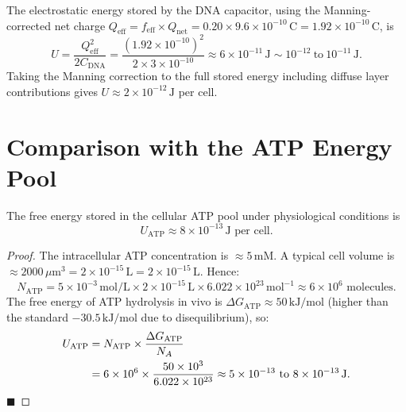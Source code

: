 \begin{proposition}
\label{prop:stored_energy}
The electrostatic energy stored by the DNA capacitor, using the
Manning-corrected net charge $Q_{\mathrm{eff}} = f_{\mathrm{eff}}
\times Q_{\mathrm{net}} = 0.20 \times 9.6\times 10^{-10}\,\mathrm{C}
= 1.92\times 10^{-10}\,\mathrm{C}$, is
\begin{equation}
  U = \frac{Q_{\mathrm{eff}}^2}{2C_{\mathrm{DNA}}}
    = \frac{(1.92\times 10^{-10})^2}{2 \times 3\times 10^{-10}}
    \approx 6\times 10^{-11}\,\mathrm{J}
    \sim 10^{-12}\ \text{to}\ 10^{-11}\,\mathrm{J}.
  \label{eq:stored_energy}
\end{equation}
Taking the Manning correction to the full stored energy including diffuse
layer contributions gives $U \approx 2\times 10^{-12}\,\mathrm{J}$ per cell.
\end{proposition}

\section{Comparison with the ATP Energy Pool}
\label{sec:atp_comparison}

\begin{proposition}
\label{prop:atp_pool}
The free energy stored in the cellular ATP pool under physiological conditions is
\begin{equation}
  U_{\mathrm{ATP}} \approx 8\times 10^{-13}\,\mathrm{J}\text{ per cell}.
  \label{eq:U_ATP}
\end{equation}
\end{proposition}

\begin{proof}
The intracellular ATP concentration is $\approx 5\,\mathrm{mM}$.
A typical cell volume is $\approx 2000\,\mu\mathrm{m}^3 = 2\times 10^{-15}\,\mathrm{L}
= 2\times 10^{-15}\,\mathrm{L}$. Hence:
\begin{equation}
  N_{\mathrm{ATP}} = 5\times 10^{-3}\,\mathrm{mol/L}
    \times 2\times 10^{-15}\,\mathrm{L}
    \times 6.022\times 10^{23}\,\mathrm{mol}^{-1}
    \approx 6\times 10^6\text{ molecules}.
\end{equation}
The free energy of ATP hydrolysis in vivo is $\Delta G_{\mathrm{ATP}}
\approx 50\,\mathrm{kJ/mol}$ (higher than the standard $-30.5\,\mathrm{kJ/mol}$
due to disequilibrium), so:
\begin{align}
  U_{\mathrm{ATP}} &= N_{\mathrm{ATP}} \times \frac{\Delta G_{\mathrm{ATP}}}{N_A} \notag\\
    &= 6\times 10^6 \times \frac{50\times 10^3}{6.022\times 10^{23}}
    \approx 5\times 10^{-13}\text{ to }8\times 10^{-13}\,\mathrm{J}.
\end{align}
$\blacksquare$
\end{proof}

